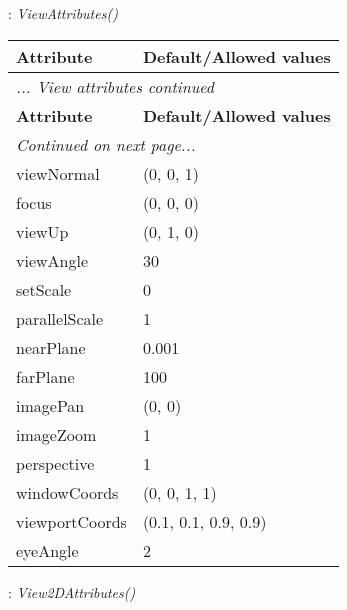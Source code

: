\documentclass[10pt,a4paper]{report}
\begin{document}
\newpage

{}
: {\it ViewAttributes() }\\[-3mm]

\begin{longtable}{ll}
{\bf Attribute} & {\bf Default/Allowed values} \\
\hline \hline
\endfirsthead
\multicolumn{2}{l}{{\it ... View attributes continued}} \\
{\bf Attribute} & {\bf Default/Allowed values} \\
\hline \hline
\endhead
\hline
\multicolumn{2}{l}{{\it Continued on next page...}} \\
\endfoot
\hline
\endlastfoot

viewNormal  &  (0, 0, 1) \\
focus  &  (0, 0, 0) \\
viewUp  &  (0, 1, 0) \\
viewAngle  &  30 \\
setScale  &  0 \\
parallelScale  &  1 \\
nearPlane  &  0.001 \\
farPlane  &  100 \\
imagePan  &  (0, 0) \\
imageZoom  &  1 \\
perspective  &  1 \\
windowCoords  &  (0, 0, 1, 1) \\
viewportCoords  &  (0.1, 0.1, 0.9, 0.9) \\
eyeAngle  &  2 \\
\end{longtable}

\newpage

{}
: {\it View2DAttributes() }\\[-3mm]
\end{document}
